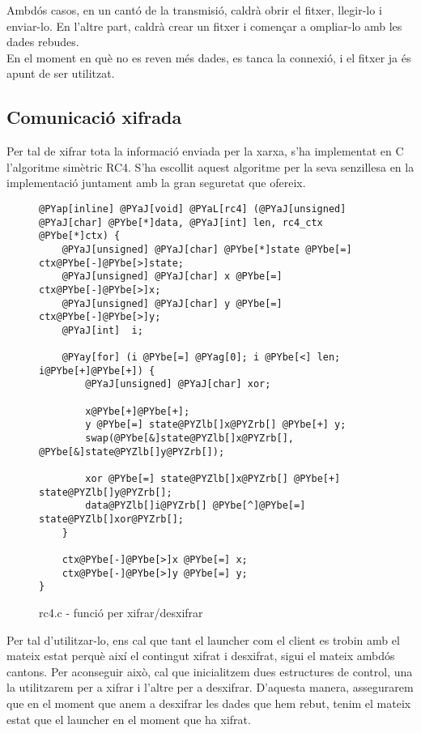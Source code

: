 Ambdós casos, en un cantó de la transmisió, caldrà obrir el fitxer, llegir-lo i enviar-lo. En l'altre part,
caldrà crear un fitxer i començar a ompliar-lo amb les dades rebudes. \\

En el moment en què no es reven més dades, es tanca la connexió, i el fitxer ja és apunt de ser utilitzat.

\subsection{Comunicació xifrada}

Per tal de xifrar tota la informació enviada per la xarxa, s'ha implementat en C l'algoritme simètric RC4.
S'ha escollit aquest algoritme per la seva senzillesa en la implementació juntament amb la gran seguretat
que ofereix.

\begin{figure}[htp]
\begin{Verbatim}[commandchars=@\[\]]
@PYap[inline] @PYaJ[void] @PYaL[rc4] (@PYaJ[unsigned] @PYaJ[char] @PYbe[*]data, @PYaJ[int] len, rc4_ctx @PYbe[*]ctx) {
    @PYaJ[unsigned] @PYaJ[char] @PYbe[*]state @PYbe[=] ctx@PYbe[-]@PYbe[>]state;
    @PYaJ[unsigned] @PYaJ[char] x @PYbe[=] ctx@PYbe[-]@PYbe[>]x;
    @PYaJ[unsigned] @PYaJ[char] y @PYbe[=] ctx@PYbe[-]@PYbe[>]y;
    @PYaJ[int]  i;
    
    @PYay[for] (i @PYbe[=] @PYag[0]; i @PYbe[<] len; i@PYbe[+]@PYbe[+]) {
        @PYaJ[unsigned] @PYaJ[char] xor;
    
        x@PYbe[+]@PYbe[+];
        y @PYbe[=] state@PYZlb[]x@PYZrb[] @PYbe[+] y;
        swap(@PYbe[&]state@PYZlb[]x@PYZrb[], @PYbe[&]state@PYZlb[]y@PYZrb[]);
    
        xor @PYbe[=] state@PYZlb[]x@PYZrb[] @PYbe[+] state@PYZlb[]y@PYZrb[];
        data@PYZlb[]i@PYZrb[] @PYbe[^]@PYbe[=] state@PYZlb[]xor@PYZrb[];
    }
    
    ctx@PYbe[-]@PYbe[>]x @PYbe[=] x;
    ctx@PYbe[-]@PYbe[>]y @PYbe[=] y;
}
\end{Verbatim}

    \caption{rc4.c - funció per xifrar/desxifrar}
    \label{fig:rc4_rc4}
\end{figure}

Per tal d'utilitzar-lo, ens cal que tant el launcher com el client es trobin amb el mateix estat perquè així
el contingut xifrat i desxifrat, sigui el mateix ambdós cantons. Per aconseguir això, cal que inicialitzem
dues estructures de control, una la utilitzarem per a xifrar i l'altre per a desxifrar. D'aquesta manera, 
assegurarem que en el moment que anem a desxifrar les dades que hem rebut, tenim el mateix estat que el 
launcher en el moment que ha xifrat.

